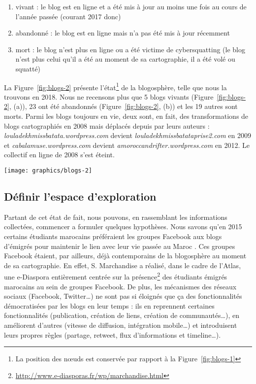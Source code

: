 \documentclass[symmetric,justified,marginals=raggedouter]{tufte-book}
\begin{document}
\begin{enumerate}[leftmargin=*]  
\item vivant : le blog est en ligne et a été mis à jour au moins une fois au cours de l'année passée (courant 2017 donc)
\item abandonné : le blog est en ligne mais n'a pas été mis à jour récemment 
\item mort : le blog n'est plus en ligne ou a été victime de cybersquatting (le blog n'est plus celui qu'il a été au moment de sa cartographie, il a été volé ou squatté)
\end{enumerate}

\noindent La Figure~\ref{fig:blogs-2} présente l'état\footnote{\RaggedOuter La position des nœuds est conservée par rapport à la Figure~\ref{fig:blogs-1}} de la blogosphère, telle que nous la trouvons en 2018. Nous ne recensons plus que 5 blogs vivants (Figure~\ref{fig:blogs-2}, (a)), 23 ont été abandonnés (Figure~\ref{fig:blogs-2}, (b)) et les 19 autres sont morts. Parmi les blogs toujours en vie, deux sont, en fait, des transformations de blogs cartographiés en 2008 mais déplacés depuis par leurs auteurs : \textit{louladekhmissbatata.wordpress.com} devient \textit{louladekhmissbatataprise2.com} en 2009 et \textit{cabalamuse.wordpress.com} devient \textit{amoroccandrifter.wordpress.com} en 2012. Le collectif en ligne de 2008 s'est éteint.

\begin{figure*}
  \texttt{[image: graphics/blogs-2]}
  \caption{La blogosphère en 2018, (a) blogs vivants, (b) blogs vivants et abandonnés, la position est conservée}
  \label{fig:blogs-2}
\end{figure*}   

\subsection{Définir l'espace d'exploration}

\noindent Partant de cet état de fait, nous pouvons, en rassemblant les informations collectées, commencer a formuler quelques hypothèses. Nous savons qu'en 2015 certains étudiants marocains préféraient les groupes Facebook aux blogs d'émigrés pour maintenir le lien avec leur vie passée au Maroc \citep{khouzaimi_e-diasporas_2015}. Ces groupes Facebook étaient, par ailleurs, déjà contemporains de la blogosphère au moment de sa cartographie. En effet, S. Marchandise a réalisé, dans le cadre de l'Atlas, une e-Diaspora \citep{marchandise_facebook_2014} entièrement centrée sur la présence\footnote{\RaggedOuter \url{http://www.e-diasporas.fr/wp/marchandise.html}} des étudiants émigrés marocains au sein de groupes Facebook. De plus, les mécanismes des réseaux sociaux (Facebook, Twitter\ldots{}) ne sont pas si éloignés que ça des fonctionnalités démocratisées par les blogs en leur temps \citep{kwak_what_2010} : ils en reprennent certaines fonctionnalités (publication, création de liens, création de communautés\ldots{}), en améliorent d'autres (vitesse de diffusion, intégration mobile\ldots{}) et introduisent leurs propres règles (partage, retweet, flux d'informations et timeline\ldots{}).\\
\end{document}
